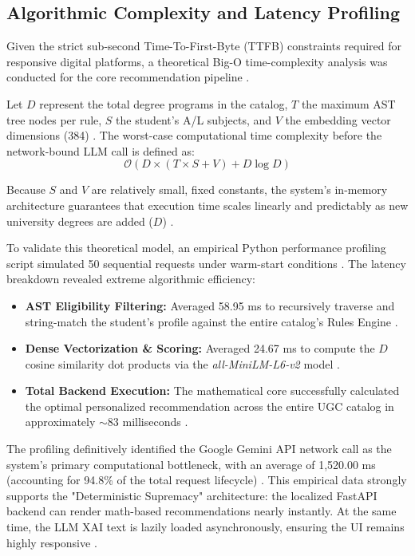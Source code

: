 \documentclass[conference]{IEEEtran}
\begin{document}
\subsection{Algorithmic Complexity and Latency Profiling}
Given the strict sub-second Time-To-First-Byte (TTFB) constraints required for responsive digital platforms, a theoretical Big-O time-complexity analysis was conducted for the core recommendation pipeline \cite{silva2026systematic}.

Let $D$ represent the total degree programs in the catalog, $T$ the maximum AST tree nodes per rule, $S$ the student's A/L subjects, and $V$ the embedding vector dimensions (384) \cite{silva2026systematic}. The worst-case computational time complexity before the network-bound LLM call is defined as:
\begin{equation}
\mathcal{O}(D \times (T \times S + V) + D \log D)
\end{equation}

Because $S$ and $V$ are relatively small, fixed constants, the system's in-memory architecture guarantees that execution time scales linearly and predictably as new university degrees are added ($D$) \cite{silva2026systematic}.

To validate this theoretical model, an empirical Python performance profiling script simulated 50 sequential requests under warm-start conditions \cite{silva2026systematic}. The latency breakdown revealed extreme algorithmic efficiency:
\begin{itemize}
    \item \textbf{AST Eligibility Filtering:} Averaged 58.95 ms to recursively traverse and string-match the student's profile against the entire catalog's Rules Engine \cite{silva2026systematic}.
    \item \textbf{Dense Vectorization \& Scoring:} Averaged 24.67 ms to compute the $D$ cosine similarity dot products via the \textit{all-MiniLM-L6-v2} model \cite{silva2026systematic}.
    \item \textbf{Total Backend Execution:} The mathematical core successfully calculated the optimal personalized recommendation across the entire UGC catalog in approximately $\sim$83 milliseconds \cite{silva2026systematic}.
\end{itemize}

The profiling definitively identified the Google Gemini API network call as the system's primary computational bottleneck, with an average of 1,520.00 ms (accounting for 94.8\% of the total request lifecycle) \cite{silva2026systematic}. This empirical data strongly supports the "Deterministic Supremacy" architecture: the localized FastAPI backend can render math-based recommendations nearly instantly. At the same time, the LLM XAI text is lazily loaded asynchronously, ensuring the UI remains highly responsive \cite{silva2026systematic}.
\end{document}
